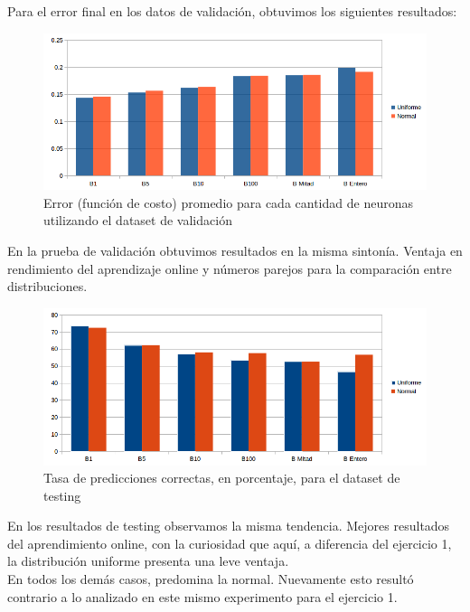 Para el error final en los datos de validación, obtuvimos los siguientes resultados:\\

\begin{figure}[h]
  \begin{center}
  \includegraphics[scale=0.65]{graficos/ej2_distribucion_error_validacion.png}
  \caption{Error (función de costo) promedio para cada cantidad de neuronas utilizando el dataset de validación}
  \end{center}
\end{figure}

En la prueba de validación obtuvimos resultados en la misma sintonía. Ventaja en rendimiento del aprendizaje online y números parejos para la comparación entre distribuciones.

\begin{figure}[h]
  \begin{center}
  \includegraphics[scale=0.65]{graficos/ej2_distribucion_eficiencia.png}
  \caption{Tasa de predicciones correctas, en porcentaje, para el dataset de testing}
  \end{center}
\end{figure}

En los resultados de testing observamos la misma tendencia. Mejores resultados del aprendimiento online, con la curiosidad que aquí, a diferencia del ejercicio 1, la distribución uniforme presenta una leve ventaja.\\
En todos los demás casos, predomina la normal. Nuevamente esto resultó contrario a lo analizado en este mismo experimento para el ejercicio 1.\\

